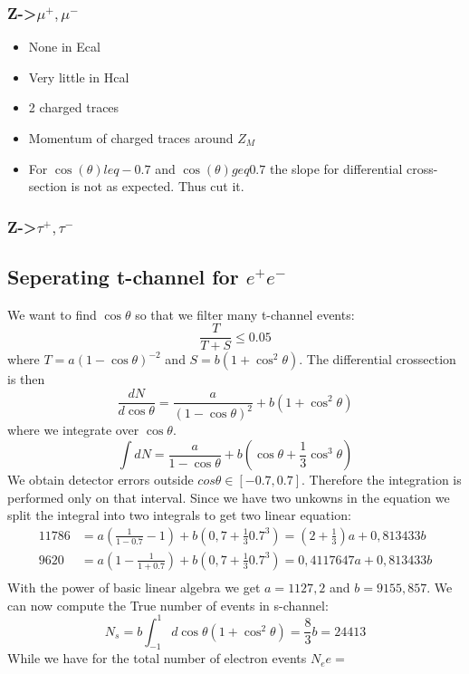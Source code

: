 \documentclass[]{article}
\begin{document}
\subsubsection{Z->$\mu^+, \mu^-$}
\begin{itemize}  
\item None in Ecal
\item Very little in Hcal
\item 2 charged traces
\item Momentum of charged traces around $Z_M$
\item For $\cos(\theta) leq -0.7$ and $\cos(\theta) geq 0.7$ the slope for differential cross-section is not as expected. Thus cut it.
\end{itemize}

\subsubsection{Z->$\tau^+, \tau^-$}

\subsection{Seperating t-channel for $e^+ e^-$}
We want to find $\cos\theta$ so that we filter many t-channel events:
\begin{equation}
\frac{T}{T+S} \leq 0.05
\label{eq:cond}
\end{equation}
where  $T=a(1-\cos{\theta})^{-2}$  and $S=b(1+\cos^2{\theta})$. 
The differential crossection is then
\begin{equation}
\frac{dN}{d\cos\theta} = \frac{a}{(1-\cos\theta)^2}+b(1+\cos^2\theta)
\end{equation}
where we integrate over $\cos\theta$.
\begin{equation}
\int dN = \frac{a}{1-\cos\theta} + b\left(\cos\theta+\frac{1}{3}\cos^3\theta\right)
\end{equation}
We obtain detector errors outside $cos\theta \in [-0.7,0.7]$. Therefore the integration is performed only on that interval. Since we have two unkowns in the equation we split the integral into two integrals to get two linear equation:
\begin{equation}
\begin{split}
11786 &= a(\frac{1}{1-0.7}-1)+b(0,7+\frac{1}{3}0.7^3) =  (2+\frac{1}{3})a+0,813433b\\
9620 &= a(1-\frac{1}{1+0.7})+b(0,7+\frac{1}{3}0.7^3) = 0,4117647a+ 0,813433b\\
\end{split}
\end{equation}
With the power of basic linear algebra we get $a=1127,2$ and $b=9155,857$.
We can now compute the True number of events in s-channel:
\begin{equation}
N_s = b\int_{-1}^1 d\cos\theta (1+\cos^2\theta) = \frac{8}{3}b = 24413
\end{equation}
While we have for the total number of electron events $N_ee=$
\end{document}
